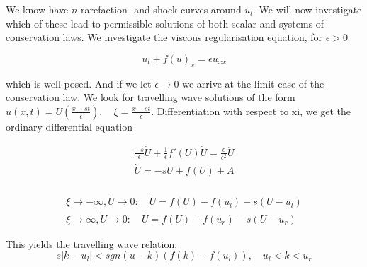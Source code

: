 We know have $n$ rarefaction- and shock curves around $u_l$. We will now investigate which of these lead to permissible solutions of both scalar and systems of conservation laws. We investigate the viscous regularisation equation, for $\epsilon > 0 $

\begin{equation}
    u_t + f(u)_x = \epsilon u_{xx}
    \label{Viscous_reg}
\end{equation}

which is well-posed. And if we let $\epsilon \to 0$ we arrive at the limit case of the conservation law. We look for travelling wave solutions of the form $u(x,t) = U(\frac{x-st}{\epsilon}), \quad \xi = \frac{x-st}{\epsilon}$. Differentiation with respect to xi, we get the ordinary differential equation

\begin{equation*}
	    \begin{split}
	        \frac{-s}{\epsilon} \dot U + \frac{1}{\epsilon} f'(U) \dot U = \frac{\epsilon}{\epsilon^2} \ddot U \\
	        \dot U = -sU + f(U) + A \\
	    \end{split}
\end{equation*}

\begin{align*}
    \xi \rightarrow -\infty, \dot U \rightarrow 0: \quad \dot U = f(U) - f(u_l) - s(U-u_l) \\
    \xi \rightarrow \infty, \dot U \rightarrow 0: \quad  \dot U = f(U) - f(u_r) - s(U-u_r)
    \label{Eq:travelling wave}
\end{align*}

This yields the travelling wave relation: 
\begin{equation*}
    s|k-u_l| < sgn(u-k)(f(k)-f(u_l)), \quad u_l < k < u_r
\end{equation*}
